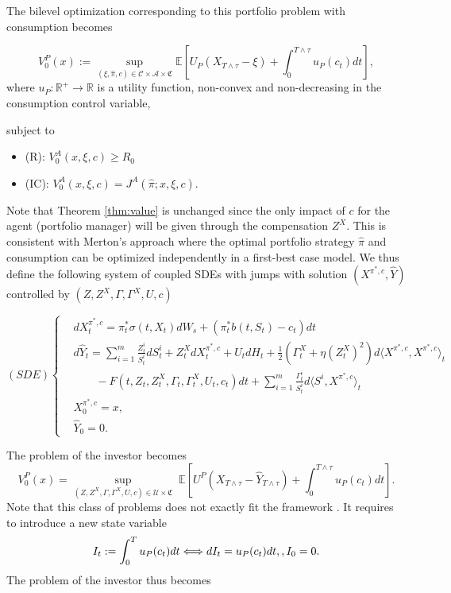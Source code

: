 \documentclass[11pt,a4paper]{article}
\theoremstyle{thmstyleone}%
\theoremstyle{thmstyletwo}%
\theoremstyle{thmstylethree}%
\begin{document}
The bilevel optimization corresponding to this portfolio problem with consumption becomes

\begin{equation}    \label{eq:principalPb:consumption}
    \tag{P}
     V_0^P(x):=\sup_{(\xi,\hat\pi,c)\in \mathcal C\times \mathcal A\times \mathfrak C}\mathbb E[U_P(X_{T\wedge \tau}-\xi)+\int_0^{T\wedge \tau} u_P(c_t)dt],
     \end{equation}
where $u_P:\mathbb R^+\longrightarrow\mathbb R$ is a utility function, non-convex and non-decreasing in the consumption control variable,

subject to
\begin{itemize}
    \item (R):\; $V_0^A(x,\xi,c)\geq R_0$
    \item (IC):\; $V_0^A(x,\xi,c) = J^A(\hat\pi;x,\xi,c)$.
\end{itemize}


Note that Theorem \ref{thm:value} is unchanged since the only impact of $c$ for the agent (portfolio manager) will be given through the compensation $Z^X$. This is consistent with Merton's approach where the optimal portfolio strategy $\hat\pi$ and consumption can be optimized independently in a first-best case model. We thus define the following system of coupled SDEs with jumps with solution $(X^{\pi^*,c},\hat Y)$ controlled by $(Z,Z^X,\Gamma,\Gamma^X,U,c)$

\[
(SDE)\begin{cases}
     &dX^{\pi^*,c}_t =  \pi_t^*\sigma(t,X_t) dW_s + (\pi_t^* b(t,S_t)-c_t) dt\\
     &d\hat Y_t= \sum_{i=1}^m \frac{Z^i_t}{S^i_t} dS^i_t +  Z_t^X dX^{\pi^*,c}_t +  U_t dH_t+ \frac{1}{2} (\Gamma_t^X + \eta (Z_t^X)^2 ) d\langle X^{\pi^*,c}, X^{\pi^*,c}\rangle_t\\
     &\qquad - F(t, Z_t, Z_t^X, \Gamma_t, \Gamma_t^X,U_t,c_t) dt+\sum_{i=1}^m \frac{\Gamma^i_t}{S^i_t}  d\langle S^i, X^{\pi^*,c}\rangle_t\\
     &X^{\pi^*,c}_0=x,\\
     &\hat Y_0=0. 
\end{cases}
\]

The problem of the investor becomes
\[
     V_0^P(x)=\sup_{(Z, Z^X, \Gamma, \Gamma^X, U,c)\in \mathcal U\times \mathfrak C}\;\mathbb E[U^P(X_{T\wedge \tau}-\hat Y_{T\wedge \tau})+\int_0^{T\wedge \tau} u_P(c_t)dt].\]
     Note that this class of problems does not exactly fit the framework \cite{blanchet2008optimal}. It requires to introduce a new state variable
     \[I_t:= \int_0^T u_P(c_t)dt\Longleftrightarrow  dI_t=u_P(c_t)dt,\\, I_0=0.\]
The problem of the investor thus becomes
\end{document}
